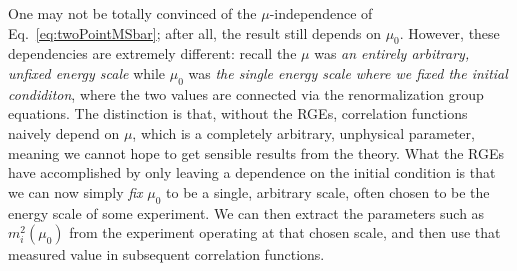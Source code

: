 \documentclass{article}
\numberwithin{equation}{subsection}
\begin{document}
One may not be totally convinced of the $\mu$-independence of Eq.~\eqref{eq:twoPointMSbar}; after all, the result still
depends on $\mu_0$. However, these dependencies are extremely different: recall the $\mu$ was \textit{an entirely
arbitrary, unfixed energy scale} while $\mu_0$ was \textit{the single energy scale where we fixed the initial
condiditon}, where the two values are connected via the renormalization group equations. The distinction is
that, without the RGEs, correlation functions naively depend on $\mu$, which is a completely arbitrary, unphysical
parameter, meaning we cannot hope to get sensible results from the theory. What the RGEs have accomplished by only
leaving a dependence on the initial condition is that we can now simply \textit{fix} $\mu_0$ to be a single, arbitrary
scale, often chosen to be the energy scale of some experiment. We can then extract the parameters such as $m_i^2(\mu_0)$
from the experiment operating at that chosen scale, and then use that measured value in subsequent correlation
functions.



\end{document}
